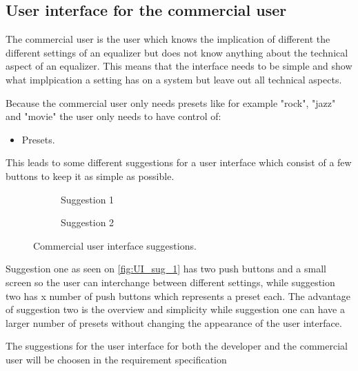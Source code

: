 \subsection*{User interface for the commercial user}
The commercial user is the user which knows the implication of different the different settings of an equalizer but does not know anything about the technical aspect of an equalizer. This means that the interface needs to be simple and show what implpication a setting has on a system but leave out all technical aspects. 

Because the commercial user only needs presets like for example "rock", "jazz" and "movie" the user only needs to have control of: 
\begin{itemize}
\item Presets.
\end{itemize} 
This leads to some different suggestions for a user interface which consist of a few buttons to keep it as simple as possible.


\begin{figure}[H]
\centering
\begin{subfigure}[t]{0.47\textwidth}
	\centering
	
	\caption{Suggestion 1}
	\label{fig:UI_sug_1}
\end{subfigure}
\hspace{6mm} 
\begin{subfigure}[t]{0.47\textwidth}
	\centering
	
	\caption{Suggestion 2}
	\label{fig:UI_sug_2}
\end{subfigure}
\caption{Commercial user interface suggestions.}
\label{fig:UI_sug}
\end{figure}

Suggestion one as seen on \autoref{fig:UI_sug_1} has two push buttons and a small screen so the user can interchange between different settings, while suggestion two has x number of push buttons which represents a preset each. The advantage of suggestion two is the overview and simplicity while suggestion one can have a larger number of presets without changing the appearance of the user interface. 

The suggestions for the user interface for both the developer and the commercial user will be choosen in the requirement specification   

